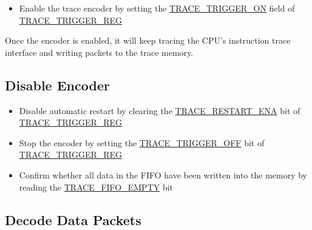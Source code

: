 \documentclass[main\_\_EN.tex]{subfiles}
\begin{document}
\begin{itemize}
    \item Enable the trace encoder by setting the \hyperref[fielddesc:TRACETRIGGERON]{TRACE\_TRIGGER\_ON} field of \hyperref[regdesc:TRACETRIGGERREG]{TRACE\_TRIGGER\_REG}

\end{itemize}

Once the encoder is enabled, it will keep tracing the CPU's instruction trace interface and writing packets to the trace memory.

\subsection{Disable Encoder}


\begin{itemize}
    \item Disable automatic restart by clearing the \hyperref[fielddesc:TRACERESTARTENA]{TRACE\_RESTART\_ENA} bit of \hyperref[regdesc:TRACETRIGGERREG]{TRACE\_TRIGGER\_REG}

    \item Stop the encoder by setting the \hyperref[fielddesc:TRACETRIGGEROFF]{TRACE\_TRIGGER\_OFF} bit of \hyperref[regdesc:TRACETRIGGERREG]{TRACE\_TRIGGER\_REG}


    \item Confirm whether all data in the FIFO have been written into the memory by reading the \hyperref[fielddesc:TRACEFIFOEMPTY]{TRACE\_FIFO\_EMPTY} bit

\end{itemize}

\subsection{Decode Data Packets}
\end{document}
